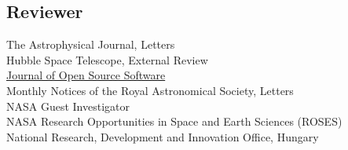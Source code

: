 \documentclass[margin]{res}
\begin{document}
\begin{resume}


\begin{comment}
year |   Fall        | Spring        | Summer
1st  | Labs-premed   | labs-eng      | labs-premed
2nd  | Labs-eng      | RA            | RA
3rd  | RA/IntroAstro | Peter's intro | RA
4th  | IntroAstro    | Python        | RA
5th  | Physics C HW  | RA            | RA & REU classes
6th  | Fellowship (GRE Class) | Python | NA!?!
\end{comment}
\vspace{1em}





\section{Reviewer}

The Astrophysical Journal, Letters \\ %
Hubble Space Telescope, External Review\\
\href{https://github.com/openjournals/joss-reviews/issues?utf8=✓&q=is\%3Aissue+benjaminrose+label\%3Areview}{Journal of Open Source Software} \\ 
Monthly Notices of the Royal Astronomical Society, Letters
\\ %
NASA Guest Investigator \\ %
NASA Research Opportunities in Space and Earth Sciences (ROSES) \\ %
National Research, Development and Innovation Office, Hungary 






\end{resume}
\end{document}
